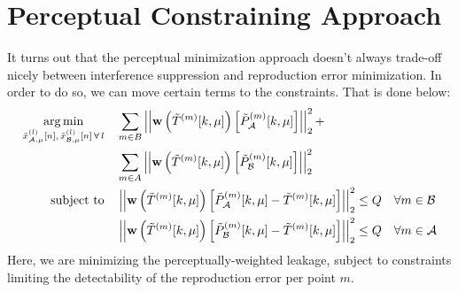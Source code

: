 \section{Perceptual Constraining Approach}
It turns out that the perceptual minimization approach doesn't always trade-off nicely between interference 
suppression and reproduction error minimization.
In order to do so, we can move certain terms to the constraints.
That is done below:
\begin{align}
    \argmin{\tilde{x}_{\za,\mu}^{(l)}[n],\,\tilde{x}_{\zb,\mu}^{(l)}[n]\,\forall\,l}{
       &\sum_{m\in B} \norm[2][2]{\vec{w}\left(\tilde{T}^{(m)}[k,\mu]\right)
        \left[\tilde{P}_{\za}^{(m)}[k,\mu]\right]} + \\
       &\sum_{m\in A} \norm[2][2]{\vec{w}\left(\tilde{T}^{(m)}[k,\mu]\right)
        \left[\tilde{P}_{\zb}^{(m)}[k,\mu]\right]}
    }\\
    \subjectto{
       &\norm[2][2]{
        \vec{w}\left(\tilde{T}^{(m)}[k,\mu]\right)\left[\tilde{P}_{\za}^{(m)}[k,\mu] - \tilde{T}^{(m)}[k,\mu]\right]} 
        \leq Q\quad\forall m\in\zb \\
       &\norm[2][2]{\vec{w}\left(\tilde{T}^{(m)}[k,\mu]\right)
        \left[\tilde{P}_{\zb}^{(m)}[k,\mu] - \tilde{T}^{(m)}[k,\mu]\right]} \leq Q\quad\forall m\in\za
    }
\end{align}
Here, we are minimizing the perceptually-weighted leakage, subject to constraints limiting the detectability of the reproduction error per point $m$. 

